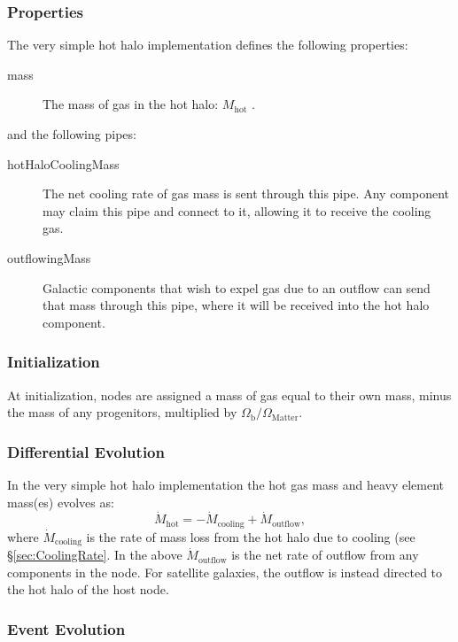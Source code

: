 \subsubsection{Properties}

The very simple hot halo implementation defines the following properties:
\begin{description}
 \item [{\normalfont \ttfamily mass}] The mass of gas in the hot halo: $M_\mathrm{hot}$ {\normalfont \ttfamily [hotHaloMass]}.
\end{description}
and the following pipes:
\begin{description}
 \item [{\normalfont \ttfamily hotHaloCoolingMass}] The net cooling rate of gas mass is sent through this pipe. Any \gls{component} may claim this pipe and connect to it, allowing it to receive the cooling gas.
 \item [{\normalfont \ttfamily outflowingMass}] Galactic components that wish to expel gas due to an outflow can send that mass  through this pipe, where it will be received into the hot halo component. 
\end{description}

\subsubsection{Initialization}

At initialization, nodes are assigned a mass of gas equal to their own mass, minus the mass of any progenitors, multiplied by $\Omega_\mathrm{b}/\Omega_\mathrm{Matter}$.

\subsubsection{Differential Evolution}

In the very simple hot halo implementation the hot gas mass and heavy element mass(es) evolves as:
\begin{equation}
 \dot{M}_\mathrm{hot} = - \dot{M}_\mathrm{cooling} + \dot{M}_\mathrm{outflow},
\end{equation}
where $\dot{M}_\mathrm{cooling}$ is the rate of mass loss from the hot halo due to cooling (see \S\ref{sec:CoolingRate}.
In the above $\dot{M}_\mathrm{outflow}$ is the net rate of outflow from any components in the node. For satellite galaxies, the outflow is instead directed to the hot halo of the host \gls{node}.

\subsubsection{Event Evolution}

